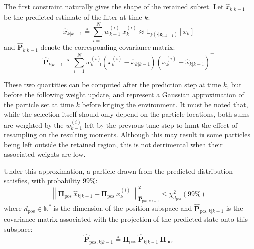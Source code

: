 The first constraint naturally gives the shape of the retained subset. Let $\hat{x}_{k|k-1}$ be the predicted estimate of the filter at time $k$:
\begin{equation}
	\hat{x}_{k|k-1}\triangleq\sum_{i=1}^Nw_{k-1}^{(i)}\:x_k^{(i)}\approx\mathbb{E}_{p(\cdot|\mathbf{z}_{1:k-1})}[x_k]
\end{equation}
and $\hat{\mathbf{P}}_{k|k-1}$ denote the corresponding covariance matrix:
\begin{equation}
	\hat{\mathbf{P}}_{k|k-1}\triangleq\sum_{i=1}^Nw_{k-1}^{(i)}\left(x_k^{(i)}-\hat{x}_{k|k-1}\right)\left(x_k^{(i)}-\hat{x}_{k|k-1}\right)^\top
\end{equation}

These two quantities can be computed after the prediction step at time $k$, but before the following weight update, and represent a Gaussian approximation of the particle set at time $k$ before kriging the environment. It must be noted that, while the selection itself should only depend on the particle locations, both sums are weighted by the $w_{k-1}^{(i)}$ left by the previous time step to limit the effect of resampling on the resulting moments. Although this may result in some particles being left outside the retained region, this is not detrimental when their associated weights are low.

Under this approximation, a particle drawn from the predicted distribution satisfies, with probability $99\%$:
\begin{equation}
	\left\|\boldsymbol{\Pi}_{\mathrm{pos}}\:\hat{x}_{k|k-1}-\boldsymbol{\Pi}_{\mathrm{pos}}\:x_k^{(i)}\right\|_{\hat{\mathbf{P}}_{\mathrm{pos},k|k-1}}^2\leq\chi_{d_{\mathrm{pos}}}^2(99\%)
\end{equation}
where $d_{\mathrm{pos}}\in\mathbb{N}^*$ is the dimension of the position subspace and $\hat{\mathbf{P}}_{\mathrm{pos},k|k-1}$ is the covariance matrix associated with the projection of the predicted state onto this subspace:
\begin{equation}
	\hat{\mathbf{P}}_{\mathrm{pos},k|k-1}\triangleq\boldsymbol{\Pi}_{\mathrm{pos}}\:\hat{\mathbf{P}}_{k|k-1}\:\boldsymbol{\Pi}_{\mathrm{pos}}^\top
\end{equation}

